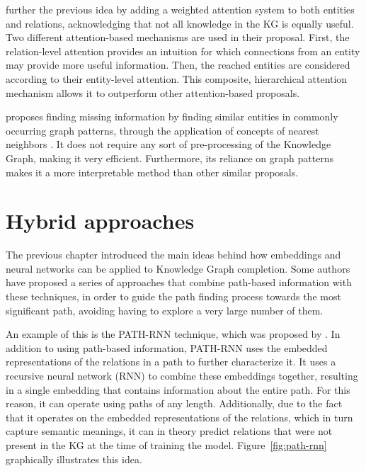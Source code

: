 \citet{zhang2020} further the previous idea by adding a weighted attention system to both entities and relations, acknowledging that not all knowledge in the KG is equally useful. Two different attention-based mechanisms are used in their proposal. First, the relation-level attention provides an intuition for which connections from an entity may provide more useful information. Then, the reached entities are considered according to their entity-level attention. This composite, hierarchical attention mechanism allows it to outperform other attention-based proposals.

\citet{ferre2019} proposes finding missing information by finding similar entities in commonly occurring graph patterns, through the application of concepts of nearest neighbors \cite{denoeux1995}. It does not require any sort of pre-processing of the Knowledge Graph, making it very efficient. Furthermore, its reliance on graph patterns makes it a more interpretable method than other similar proposals.

\section{Hybrid approaches}\label{sec:path-hybrid}
The previous chapter introduced the main ideas behind how embeddings and neural networks can be applied to Knowledge Graph completion. Some authors have proposed a series of approaches that combine path-based information with these techniques, in order to guide the path finding process towards the most significant path, avoiding having to explore a very large number of them.

An example of this is the PATH-RNN technique, which was proposed by \citet{neelakantan2015}. In addition to using path-based information, PATH-RNN uses the embedded representations of the relations in a path to further characterize it. It uses a recursive neural network (RNN) to combine these embeddings together, resulting in a single embedding that contains information about the entire path. For this reason, it can operate using paths of any length. Additionally, due to the fact that it operates on the embedded representations of the relations, which in turn capture semantic meanings, it can in theory predict relations that were not present in the KG at the time of training the model. Figure~\ref{fig:path-rnn} graphically illustrates this idea.

